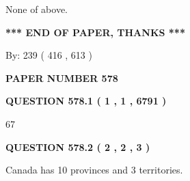 \documentclass[12pt]{article}
\begin{document}
  
 
 
\noindent{}
 
 
 None of above.
 
 
 
 
   
   
 \vspace{0.2in}
 
   
   
   
   
\vspace{1.0in} 
{\textbf{\large{ *** END OF PAPER, THANKS *** }}} 
   
   
\hspace{1.0in} By: 
 239 ( 416 ,  613 )
   
   
   
   
\newpage 
\setcounter{page}{ 
   578001 } 
   
   
   
   
 {\textbf{ \Large{ PAPER NUMBER  578  }}}
   
   
\vspace{0.2in}
   
   
   
   
   
   
 \vspace{0.2in}
 
 
 
 
   
   
  
\vspace{0.2in}
  
{\textbf{\Large{QUESTION
578.1 
 ( 1 , 1 , 6791 )
}}}
  
  
 
 
\noindent{}

67
 
 
  
\vspace{0.2in}
  
{\textbf{\Large{QUESTION
578.2 
 ( 2 , 2 , 3 )
}}}
  
  
 
 
\noindent{}
 
 
Canada has 10  provinces and 3 territories.
 
\end{document}
